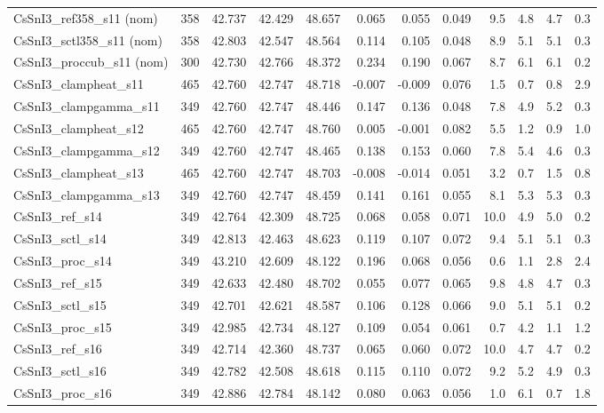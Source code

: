 \begin{landscape}
\begin{longtable}{llrrrrrrrrrc}
CsSnI3\_ref358\_s11 (nom) & 358 & 42.737 & 42.429 & 48.657 & 0.065 & 0.055 & 0.049 & 9.5 & 4.8 & 4.7 & 0.3 \\
CsSnI3\_sctl358\_s11 (nom) & 358 & 42.803 & 42.547 & 48.564 & 0.114 & 0.105 & 0.048 & 8.9 & 5.1 & 5.1 & 0.3 \\
CsSnI3\_proccub\_s11 (nom) & 300 & 42.730 & 42.766 & 48.372 & 0.234 & 0.190 & 0.067 & 8.7 & 6.1 & 6.1 & 0.2 \\
CsSnI3\_clampheat\_s11 & 465 & 42.760 & 42.747 & 48.718 & -0.007 & -0.009 & 0.076 & 1.5 & 0.7 & 0.8 & 2.9 \\
CsSnI3\_clampgamma\_s11 & 349 & 42.760 & 42.747 & 48.446 & 0.147 & 0.136 & 0.048 & 7.8 & 4.9 & 5.2 & 0.3 \\
CsSnI3\_clampheat\_s12 & 465 & 42.760 & 42.747 & 48.760 & 0.005 & -0.001 & 0.082 & 5.5 & 1.2 & 0.9 & 1.0 \\
CsSnI3\_clampgamma\_s12 & 349 & 42.760 & 42.747 & 48.465 & 0.138 & 0.153 & 0.060 & 7.8 & 5.4 & 4.6 & 0.3 \\
CsSnI3\_clampheat\_s13 & 465 & 42.760 & 42.747 & 48.703 & -0.008 & -0.014 & 0.051 & 3.2 & 0.7 & 1.5 & 0.8 \\
CsSnI3\_clampgamma\_s13 & 349 & 42.760 & 42.747 & 48.459 & 0.141 & 0.161 & 0.055 & 8.1 & 5.3 & 5.3 & 0.3 \\
CsSnI3\_ref\_s14 & 349 & 42.764 & 42.309 & 48.725 & 0.068 & 0.058 & 0.071 & 10.0 & 4.9 & 5.0 & 0.2 \\
CsSnI3\_sctl\_s14 & 349 & 42.813 & 42.463 & 48.623 & 0.119 & 0.107 & 0.072 & 9.4 & 5.1 & 5.1 & 0.3 \\
CsSnI3\_proc\_s14 & 349 & 43.210 & 42.609 & 48.122 & 0.196 & 0.068 & 0.056 & 0.6 & 1.1 & 2.8 & 2.4 \\
CsSnI3\_ref\_s15 & 349 & 42.633 & 42.480 & 48.702 & 0.055 & 0.077 & 0.065 & 9.8 & 4.8 & 4.7 & 0.3 \\
CsSnI3\_sctl\_s15 & 349 & 42.701 & 42.621 & 48.587 & 0.106 & 0.128 & 0.066 & 9.0 & 5.1 & 5.1 & 0.2 \\
CsSnI3\_proc\_s15 & 349 & 42.985 & 42.734 & 48.127 & 0.109 & 0.054 & 0.061 & 0.7 & 4.2 & 1.1 & 1.2 \\
CsSnI3\_ref\_s16 & 349 & 42.714 & 42.360 & 48.737 & 0.065 & 0.060 & 0.072 & 10.0 & 4.7 & 4.7 & 0.2 \\
CsSnI3\_sctl\_s16 & 349 & 42.782 & 42.508 & 48.618 & 0.115 & 0.110 & 0.072 & 9.2 & 5.2 & 4.9 & 0.3 \\
CsSnI3\_proc\_s16 & 349 & 42.886 & 42.784 & 48.142 & 0.080 & 0.063 & 0.056 & 1.0 & 6.1 & 0.7 & 1.8 \\

\end{longtable}
\end{landscape}
